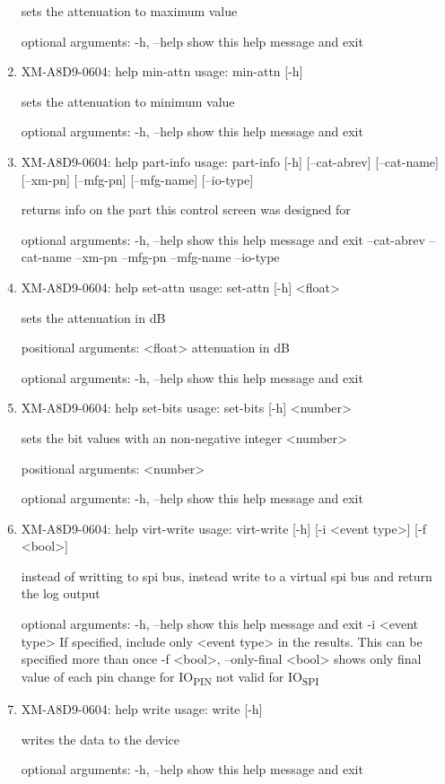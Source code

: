 \documentclass[11pt]{article}
\begin{document}
\begin{enumerate}
sets the attenuation to maximum value

optional arguments:
  -h, --help  show this help message and exit

\item XM-A8D9-0604: help min-attn
\label{sec:orgb0c517c}
usage: min-attn [-h]

sets the attenuation to minimum value

optional arguments:
  -h, --help  show this help message and exit

\item XM-A8D9-0604: help part-info
\label{sec:org83bc8a1}
usage: part-info  [-h] [--cat-abrev] [--cat-name] [--xm-pn] [--mfg-pn] [--mfg-name]
        [--io-type]

returns info on the part this control screen was designed for

optional arguments:
  -h, --help   show this help message and exit
  --cat-abrev
  --cat-name
  --xm-pn
  --mfg-pn
  --mfg-name
  --io-type

\item XM-A8D9-0604: help set-attn
\label{sec:org9eceb56}
usage: set-attn [-h] <float>

sets the attenuation in dB

positional arguments:
  <float>     attenuation in dB

optional arguments:
  -h, --help  show this help message and exit

\item XM-A8D9-0604: help set-bits
\label{sec:orgc9675a4}
usage: set-bits [-h] <number>

sets the bit values with an non-negative integer <number>

positional arguments:
  <number>

optional arguments:
  -h, --help  show this help message and exit

\item XM-A8D9-0604: help virt-write
\label{sec:org54a1ad9}
usage: virt-write [-h] [-i <event type>] [-f <bool>]

instead of writting to spi bus, instead write to a virtual spi bus and return
the log output

optional arguments:
  -h, --help            show this help message and exit
  -i <event type>       If specified, include only <event type> in the
                        results. This can be specified more than once
  -f <bool>, --only-final <bool>
                        shows only final value of each pin change for IO\textsubscript{PIN}
                        not valid for IO\textsubscript{SPI}

\item XM-A8D9-0604: help write
\label{sec:orgeab1a68}
usage: write [-h]

writes the data to the device

optional arguments:
  -h, --help  show this help message and exit
\end{enumerate}
\end{document}

